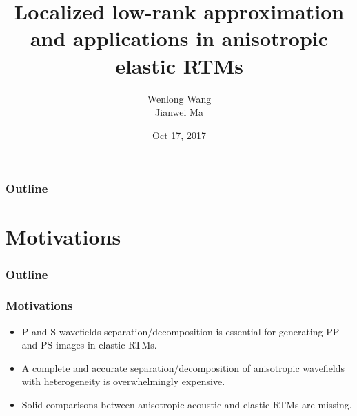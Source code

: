 \documentclass[aspectratio=169]{beamer}
\title[Anisotropic elastic RTM]{Localized low-rank approximation and applications in anisotropic elastic RTMs}
\author[W. Wang]{Wenlong Wang \inst{1} \\{Jianwei Ma \inst{1}}}
\institute[HIT]{\inst{1} Harbin Institute of Techonology
}
\date[Oct 2017]{Oct 17, 2017}
\begin{document}



\begin{frame}[plain]
  \titlepage
\end{frame}

\begin{frame}
\frametitle{Outline}
\tableofcontents
\end{frame}
\section{Motivations}
\begin{frame}
\frametitle{Outline}
\tableofcontents[currentsection]
\end{frame}
\begin{frame}
  \frametitle{Motivations}
\begin{itemize}
\item{P and S wavefields separation/decomposition is essential for generating PP and PS images in elastic RTMs.}
\item{A complete and accurate separation/decomposition of anisotropic wavefields with heterogeneity is overwhelmingly expensive. }
\item{Solid comparisons between anisotropic acoustic and elastic RTMs are missing.}
\end{itemize}
\end{frame}
\end{document}
